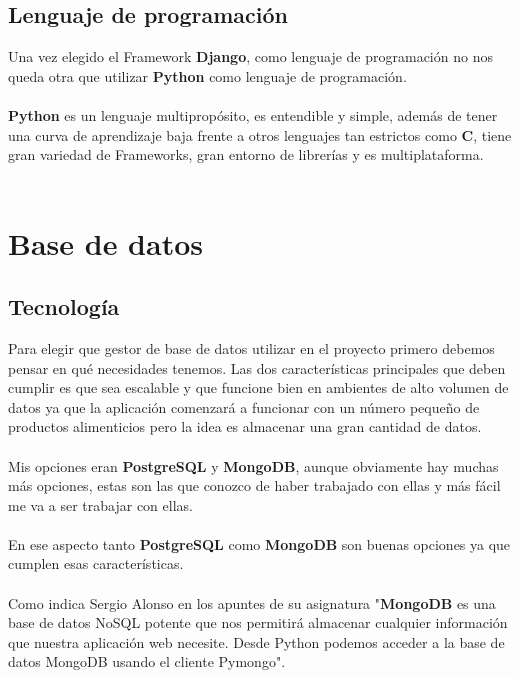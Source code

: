 \subsection{Lenguaje de programación}

Una vez elegido el Framework \textbf{Django}, como lenguaje de programación no nos queda otra que utilizar \textbf{Python} como lenguaje de programación.\\\\
\textbf{Python} es un lenguaje multipropósito, es entendible y simple, además de tener una curva de aprendizaje baja frente a otros lenguajes tan estrictos como \textbf{C}, 
tiene gran variedad de Frameworks, gran entorno de librerías y es multiplataforma.\\ \\

\section{Base de datos} \label{sec:base_datos}

\subsection{Tecnología}

Para elegir que gestor de base de datos utilizar en el proyecto primero debemos pensar en qué necesidades tenemos.
Las dos características principales que deben cumplir es que sea escalable y que funcione bien en ambientes de alto volumen 
de datos ya que la aplicación comenzará a funcionar con un número pequeño de productos alimenticios pero la idea es almacenar una gran cantidad de datos.\\ \\
Mis opciones eran \textbf{PostgreSQL} y \textbf{MongoDB}, aunque obviamente hay muchas más opciones, estas son las que conozco de haber trabajado con ellas y
más fácil me va a ser trabajar con ellas.\\ \\

En ese aspecto tanto \textbf{PostgreSQL} como \textbf{MongoDB} son buenas opciones ya que cumplen esas características.\\ \\

Como indica Sergio Alonso en los apuntes de su asignatura \cite{NoSQL} "\textbf{MongoDB} es una base de datos NoSQL potente que nos permitirá almacenar cualquier información que nuestra aplicación web necesite. Desde Python podemos acceder a la base de datos MongoDB usando el cliente Pymongo".

